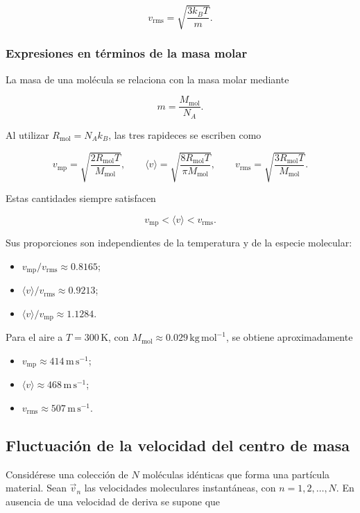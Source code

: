 $$
\boxed{
v_{\mathrm{rms}}=\sqrt{\frac{3k_BT}{m}}
}.
$$

\subsubsection{Expresiones en términos de la masa molar}

La masa de una molécula se relaciona con la masa molar mediante

$$
m=\frac{M_{\mathrm{mol}}}{N_A}.
$$

Al utilizar $R_{\mathrm{mol}}=N_Ak_B$, las tres rapideces se escriben como

$$
\boxed{
v_{\mathrm{mp}}
=\sqrt{\frac{2R_{\mathrm{mol}}T}{M_{\mathrm{mol}}}},
\qquad
\langle v\rangle
=\sqrt{\frac{8R_{\mathrm{mol}}T}{\pi M_{\mathrm{mol}}}},
\qquad
v_{\mathrm{rms}}
=\sqrt{\frac{3R_{\mathrm{mol}}T}{M_{\mathrm{mol}}}}
}.
$$

Estas cantidades siempre satisfacen

$$
v_{\mathrm{mp}}<\langle v\rangle<v_{\mathrm{rms}}.
$$

Sus proporciones son independientes de la temperatura y de la especie
molecular:

\begin{itemize}
    \item $v_{\mathrm{mp}}/v_{\mathrm{rms}}\approx0.8165$;
    \item $\langle v\rangle/v_{\mathrm{rms}}\approx0.9213$;
    \item $\langle v\rangle/v_{\mathrm{mp}}\approx1.1284$.
\end{itemize}

Para el aire a $T=300\,\mathrm{K}$, con
$M_{\mathrm{mol}}\approx0.029\,\mathrm{kg\,mol^{-1}}$, se obtiene
aproximadamente

\begin{itemize}
    \item $v_{\mathrm{mp}}\approx414\,\mathrm{m\,s^{-1}}$;
    \item $\langle v\rangle\approx468\,\mathrm{m\,s^{-1}}$;
    \item $v_{\mathrm{rms}}\approx507\,\mathrm{m\,s^{-1}}$.
\end{itemize}

\subsection{Fluctuación de la velocidad del centro de masa}

Considérese una colección de $N$ moléculas idénticas que forma una partícula
material. Sean $\vec{v}_n$ las velocidades moleculares instantáneas, con
$n=1,2,\ldots,N$. En ausencia de una velocidad de deriva se supone que

